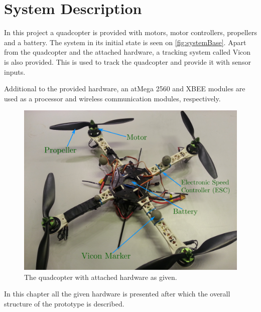 \chapter{System Description}
In this project a quadcopter is provided with motors, motor controllers, propellers and a battery. The system in its initial state is seen on \autoref{fig:systemBase}. Apart from the quadcopter and the attached hardware, a tracking system called Vicon is also provided. This is used to track the quadcopter and provide it with sensor inputs.

Additional to the provided hardware, an atMega 2560 and XBEE modules are used as a processor and wireless communication modules, respectively.

\begin{figure}[H]
  \centering
  \includegraphics[width=.6\linewidth]{figures/quadcopterBaseLabels}
  \caption{The quadcopter with attached hardware as given.}
  \label{fig:systemBase}
\end{figure}

In this chapter all the given hardware is presented after which the overall structure of the prototype is described.